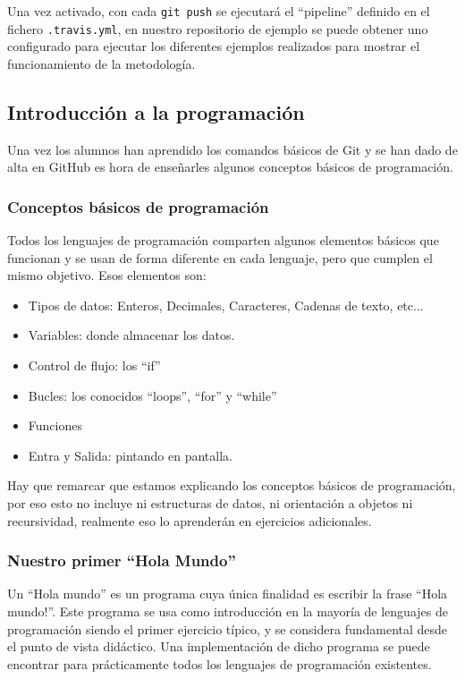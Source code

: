 Una vez activado, con cada \texttt{git push} se ejecutará el ``pipeline'' definido en el fichero \texttt{.travis.yml}, en nuestro repositorio de ejemplo se puede obtener uno configurado para ejecutar los diferentes ejemplos realizados para mostrar el funcionamiento de la metodología.

\subsection{Introducción a la programación}

Una vez los alumnos han aprendido los comandos básicos de Git y se han dado de alta en GitHub es hora de enseñarles algunos conceptos básicos de programación.

\subsubsection{Conceptos básicos de programación}

Todos los lenguajes de programación comparten algunos elementos básicos que funcionan y se usan de forma diferente en cada lenguaje, pero que cumplen el mismo objetivo. Esos elementos son:

\begin{itemize}
  \item Tipos de datos: Enteros, Decimales, Caracteres, Cadenas de texto, etc...
  \item Variables: donde almacenar los datos.
  \item Control de flujo: los ``if''
  \item Bucles: los conocidos ``loops'', ``for'' y ``while''
  \item Funciones
  \item Entra y Salida: pintando en pantalla.
\end{itemize}

Hay que remarcar que estamos explicando los conceptos básicos de programación, por eso esto no incluye ni estructuras de datos, ni orientación a objetos ni recursividad, realmente eso lo aprenderán en ejercicios adicionales.

\subsubsection{Nuestro primer ``Hola Mundo''}

Un ``Hola mundo'' es un programa cuya única finalidad es escribir la frase ``Hola mundo!''. Este programa se usa como introducción en la mayoría de lenguajes de programación siendo el primer ejercicio típico, y se considera fundamental desde el punto de vista didáctico. Una implementación de dicho programa se puede encontrar para prácticamente todos los lenguajes de programación existentes.

